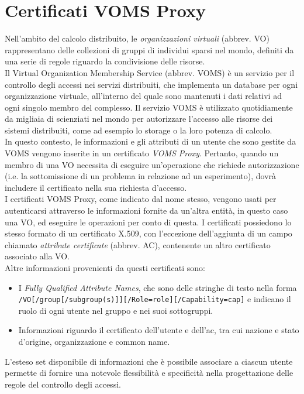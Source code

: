 \section{Certificati VOMS Proxy}
Nell'ambito del calcolo distribuito, le \textit{organizzazioni virtuali} (abbrev. VO) rappresentano delle collezioni di gruppi 
di individui sparsi nel mondo, definiti da una serie di regole riguardo la condivisione delle risorse. 
\\Il Virtual Organization Membership Service (abbrev. VOMS) è un servizio per il controllo degli accessi 
nei servizi distribuiti, che implementa
un database per ogni organizzazione virtuale, all'interno del
quale sono mantenuti i dati relativi ad ogni singolo membro del complesso. Il servizio VOMS è utilizzato quotidiamente da 
migliaia di scienziati nel mondo per autorizzare l'accesso alle risorse dei sistemi distribuiti, come ad esempio lo storage o la
loro potenza di calcolo. 
\\ In questo contesto, le informazioni e gli attributi di un utente che sono gestite da VOMS vengono inserite in un certificato \textit{VOMS Proxy}.
Pertanto, quando un membro di una VO necessita di eseguire un'operazione che richiede autorizzazione (i.e. la sottomissione di un problema in relazione ad un esperimento), 
dovrà includere il certificato nella sua richiesta d'accesso. 
\\ I certificati VOMS Proxy, come indicato dal nome stesso, vengono usati per autenticarsi attraverso le informazioni fornite da un'altra entità, in questo caso una VO, ed eseguire le operazioni
per conto di questa. I certificati possiedono lo stesso formato di un certificato X.509, con l'eccezione dell'aggiunta di un campo chiamato \textit{attribute certificate} (abbrev. AC),
 contenente un altro certificato associato alla VO. 
\\ Altre informazioni provenienti da questi certificati sono:
\begin{itemize}
    \item I \textit{Fully Qualified Attribute Names}, che sono delle stringhe di testo nella 
    forma \texttt{/VO[/group[/subgroup(s)]][/Role=role][/Capability=cap]} e indicano il ruolo di ogni utente nel gruppo e nei suoi sottogruppi. 
    \item Informazioni riguardo il certificato dell'utente e dell'ac, tra cui nazione e stato d'origine, organizzazione e common name.   
\end{itemize}
L'esteso set disponibile di informazioni che è possibile associare a ciascun utente permette di fornire
 una notevole flessibilità e specificità nella progettazione delle regole del controllo degli accessi. 


